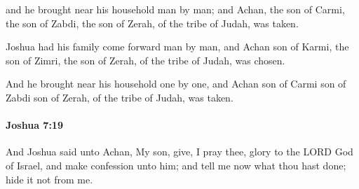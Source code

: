 			\begin{versebox}
					\item[BHS] 
					\item[ASV] and he brought near his household man by man; and Achan, the son of Carmi, the son of Zabdi, the son of Zerah, of the tribe of Judah, was taken.
					\item[NIV] Joshua had his family come forward man by man, and Achan son of Karmi, the son of Zimri, the son of Zerah, of the tribe of Judah, was chosen.
					\item[NRSV] And he brought near his household one by one, and Achan son of Carmi son of Zabdi son of Zerah, of the tribe of Judah, was taken.
			\end{versebox}

		\paragraph{Joshua 7:19} %
			\label{JOSHUA-7-19}

			And Joshua said unto Achan, My son, give, I pray thee, glory to the LORD God of Israel, and make confession unto him; and tell me now what thou hast done; hide it not from me.

